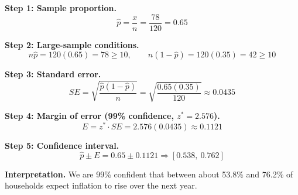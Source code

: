 	\textbf{Step 1: Sample proportion.}
	\[
	\hat{p} = \frac{x}{n} = \frac{78}{120} = 0.65
	\]
	
	\textbf{Step 2: Large-sample conditions.}
	\[
	n\hat{p} = 120(0.65) = 78 \ge 10, \qquad n(1-\hat{p}) = 120(0.35) = 42 \ge 10
	\]
	
	\textbf{Step 3: Standard error.}
	\[
	SE = \sqrt{\frac{\hat{p}(1-\hat{p})}{n}} = \sqrt{\frac{0.65(0.35)}{120}} \approx 0.0435
	\]
	
	\textbf{Step 4: Margin of error (99\% confidence, \(z^* = 2.576\)).}
	\[
	E = z^* \cdot SE = 2.576(0.0435) \approx 0.1121
	\]
	
	\textbf{Step 5: Confidence interval.}
	\[
	\hat{p} \pm E = 0.65 \pm 0.1121 \Rightarrow [0.538,\ 0.762]
	\]
	
	\textbf{Interpretation.}
	We are 99\% confident that between about 53.8\% and 76.2\% of households expect inflation to rise over the next year.
	

